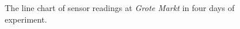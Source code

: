 \begin{figure}[H]
\begin{adjustwidth}{-1cm}{}
{{    }
  }
  \end{adjustwidth}
  \caption[The line chart of sensor readings at Grote Markt.]
  {The line chart of sensor readings at \textit{Grote Markt} in four days of experiment.}
  \label{fig:result-grotemarkt-line-chart}
\end{figure}


